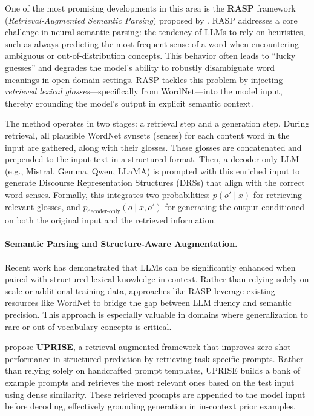 One of the most promising developments in this area is the \textbf{RASP} framework (\textit{Retrieval-Augmented Semantic Parsing}) proposed by \citet{zhang2024rasp}. RASP addresses a core challenge in neural semantic parsing: the tendency of LLMs to rely on heuristics, such as always predicting the most frequent sense of a word when encountering ambiguous or out-of-distribution concepts. This behavior often leads to ``lucky guesses'' and degrades the model's ability to robustly disambiguate word meanings in open-domain settings. RASP tackles this problem by injecting \textit{retrieved lexical glosses}—specifically from WordNet—into the model input, thereby grounding the model's output in explicit semantic context.

The method operates in two stages: a retrieval step and a generation step. During retrieval, all plausible WordNet synsets (senses) for each content word in the input are gathered, along with their glosses. These glosses are concatenated and prepended to the input text in a structured format. Then, a decoder-only LLM (e.g., Mistral, Gemma, Qwen, LLaMA) is prompted with this enriched input to generate Discourse Representation Structures (DRSs) that align with the correct word senses. Formally, this integrates two probabilities: \( p(o' \mid x) \) for retrieving relevant glosses, and \( p_{\text{decoder-only}}(o \mid x, o') \) for generating the output conditioned on both the original input and the retrieved information.

\paragraph{Semantic Parsing and Structure-Aware Augmentation.} Recent work has demonstrated that LLMs can be significantly enhanced when paired with structured lexical knowledge in context. Rather than relying solely on scale or additional training data, approaches like RASP leverage existing resources like WordNet to bridge the gap between LLM fluency and semantic precision. This approach is especially valuable in domains where generalization to rare or out-of-vocabulary concepts is critical.

\citet{cheng2023uprise} propose \textbf{UPRISE}, a retrieval-augmented framework that improves zero-shot performance in structured prediction by retrieving task-specific prompts. Rather than relying solely on handcrafted prompt templates, UPRISE builds a bank of example prompts and retrieves the most relevant ones based on the test input using dense similarity. These retrieved prompts are appended to the model input before decoding, effectively grounding generation in in-context prior examples.


